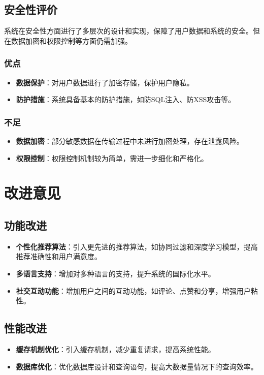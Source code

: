 \documentclass{ctexart}
\begin{document}
\subsection{安全性评价}
系统在安全性方面进行了多层次的设计和实现，保障了用户数据和系统的安全。但在数据加密和权限控制等方面仍需加强。

\subsubsection{优点}
\begin{itemize}
    \item \textbf{数据保护}：对用户数据进行了加密存储，保护用户隐私。
    \item \textbf{防护措施}：系统具备基本的防护措施，如防SQL注入、防XSS攻击等。
\end{itemize}

\subsubsection{不足}
\begin{itemize}
    \item \textbf{数据加密}：部分敏感数据在传输过程中未进行加密处理，存在泄露风险。
    \item \textbf{权限控制}：权限控制机制较为简单，需进一步细化和严格化。
\end{itemize}

\section{改进意见}

\subsection{功能改进}
\begin{itemize}
    \item \textbf{个性化推荐算法}：引入更先进的推荐算法，如协同过滤和深度学习模型，提高推荐准确性和用户满意度。
    \item \textbf{多语言支持}：增加对多种语言的支持，提升系统的国际化水平。
    \item \textbf{社交互动功能}：增加用户之间的互动功能，如评论、点赞和分享，增强用户粘性。
\end{itemize}

\subsection{性能改进}
\begin{itemize}
    \item \textbf{缓存机制优化}：引入缓存机制，减少重复请求，提高系统性能。
    \item \textbf{数据库优化}：优化数据库设计和查询语句，提高大数据量情况下的查询效率。
\end{itemize}
\end{document}
